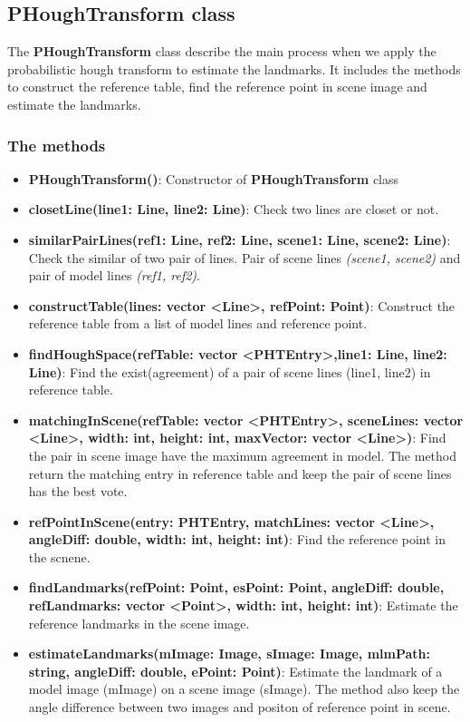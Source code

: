 \subsection{PHoughTransform class}
The \textbf{PHoughTransform} class describe the main process when we apply the probabilistic hough transform to estimate the landmarks. It includes the methods to construct the reference table, find the reference point in scene image and estimate the landmarks.
\subsubsection{The methods}
\begin{itemize}
\item\textbf{PHoughTransform()}: Constructor of \textbf{PHoughTransform} class
\item\textbf{closetLine(line1: Line, line2: Line)}: Check two lines are closet or not.
\item\textbf{similarPairLines(ref1: Line, ref2: Line, scene1: Line, scene2: Line)}: Check the similar of two pair of lines. Pair of scene lines \textit{(scene1, scene2)} and pair of model lines \textit{(ref1, ref2)}.
\item\textbf{constructTable(lines: vector \textless Line\textgreater , refPoint: Point)}: Construct the reference table from a list of model lines and reference point.
\item\textbf{findHoughSpace(refTable: vector \textless PHTEntry\textgreater ,line1: Line, line2: Line)}: Find the exist(agreement) of a pair of scene lines (line1, line2) in reference table.
\item\textbf{matchingInScene(refTable: vector \textless PHTEntry\textgreater , sceneLines: vector \textless Line\textgreater , width: int, height: int, maxVector: vector \textless Line\textgreater)}: Find the pair in scene image have the maximum agreement in model. The method return the matching entry in reference table and keep the pair of scene lines has the best vote.
\item\textbf{refPointInScene(entry: PHTEntry, matchLines: vector \textless Line\textgreater, angleDiff: double, width: int, height: int)}: Find the reference point in the scnene.
\item\textbf{findLandmarks(refPoint: Point, esPoint: Point, angleDiff: double, refLandmarks: vector \textless Point\textgreater , width: int, height: int)}: Estimate the reference landmarks in the scene image.
\item\textbf{estimateLandmarks(mImage: Image, sImage: Image, mlmPath: string, angleDiff: double, ePoint: Point)}: Estimate the landmark of a model image (mImage) on a scene image (sImage). The method also keep the angle difference between two images and positon of reference point in scene.

\end{itemize}
